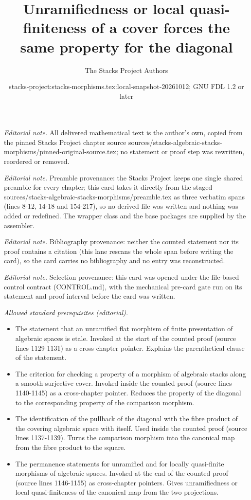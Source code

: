 \documentclass[10pt,a4paper]{amsart}
\title{Unramifiedness or local quasi-finiteness of a cover forces the same property for the diagonal}
\author{The Stacks Project Authors}
\date{stacks-project:stacks-morphisms.tex:local-snapshot-20261012; GNU FDL 1.2 or later}
\theoremstyle{plain}
\theoremstyle{definition}
\theoremstyle{remark}
\numberwithin{equation}{subsection}
\begin{document}
\maketitle
\noindent\textit{Editorial note.} All delivered mathematical text is the author's own, copied from the pinned Stacks Project chapter source sources/stacks-algebraic-stacks-morphisms/pinned-original-source.tex; no statement or proof step was rewritten, reordered or removed.\par\medskip
\noindent\textit{Editorial note.} Preamble provenance: the Stacks Project keeps one single shared preamble for every chapter; this card takes it directly from the staged sources/stacks-algebraic-stacks-morphisms/preamble.tex as three verbatim spans (lines 8-12, 14-18 and 154-217), so no derived file was written and nothing was added or redefined. The wrapper class and the base packages are supplied by the assembler.\par\medskip
\noindent\textit{Editorial note.} Bibliography provenance: neither the counted statement nor its proof contains a citation (this lane rescans the whole span before writing the card), so the card carries no bibliography and no entry was reconstructed.\par\medskip
\noindent\textit{Editorial note.} Selection provenance: this card was opened under the file-based control contract (CONTROL.md), with the mechanical pre-card gate run on its statement and proof interval before the card was written.\par\medskip
\noindent\textit{Allowed standard prerequisites (editorial).}\begin{itemize}
\item The statement that an unramified flat morphism of finite presentation of algebraic spaces is etale. Invoked at the start of the counted proof (source lines 1129-1131) as a cross-chapter pointer. Explains the parenthetical clause of the statement.
\item The criterion for checking a property of a morphism of algebraic stacks along a smooth surjective cover. Invoked inside the counted proof (source lines 1140-1145) as a cross-chapter pointer. Reduces the property of the diagonal to the corresponding property of the comparison morphism.
\item The identification of the pullback of the diagonal with the fibre product of the covering algebraic space with itself. Used inside the counted proof (source lines 1137-1139). Turns the comparison morphism into the canonical map from the fibre product to the square.
\item The permanence statements for unramified and for locally quasi-finite morphisms of algebraic spaces. Invoked at the end of the counted proof (source lines 1146-1155) as cross-chapter pointers. Gives unramifiedness or local quasi-finiteness of the canonical map from the two projections.
\end{itemize}\medskip
\end{document}
